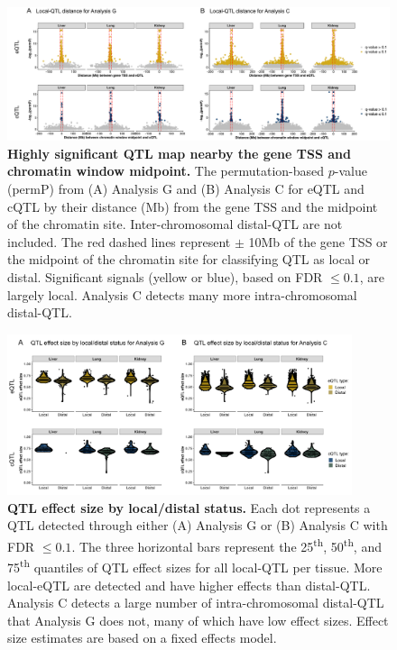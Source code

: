 \documentclass[10pt,letterpaper,twoside]{article}
\begin{document}
\begin{figure}[hp]
\renewcommand{\familydefault}{\sfdefault}\normalfont
\centering
\includegraphics[width=\textwidth]{figs/qtl_distance_all.pdf}
\caption{\textbf{Highly significant QTL map nearby the gene TSS and chromatin window midpoint.} 
The permutation-based $p$-value (permP) from (A) Analysis G and (B) Analysis C for eQTL and cQTL by their distance (Mb) from the gene TSS and the midpoint of the chromatin site. Inter-chromosomal distal-QTL are not included. The red dashed lines represent $\pm$ 10Mb of the gene TSS or the midpoint of the chromatin site for classifying QTL as local or distal. Significant signals (yellow or blue), based on FDR $\le 0.1$, are largely local. Analysis C detects many more intra-chromosomal distal-QTL.
\label{fig:dist_all}}
\end{figure}

\clearpage

\begin{figure}[hp]
\renewcommand{\familydefault}{\sfdefault}\normalfont
\centering
\includegraphics[width=0.9\textwidth, trim={0in 0.25in 0in 0in}, clip]{figs/qtl_effect_sizes_local_v_distal.png}
\caption{\textbf{QTL effect size by local/distal status.} 
Each dot represents a QTL detected through either (A) Analysis G or (B) Analysis C with FDR $\le 0.1$. The three horizontal bars represent the 25\textsuperscript{th}, 50\textsuperscript{th}, and 75\textsuperscript{th} quantiles of QTL effect sizes for all local-QTL per tissue. More local-eQTL are detected and have higher effects than distal-QTL. Analysis C detects a large number of intra-chromosomal distal-QTL that Analysis G does not, many of which have low effect sizes. Effect size estimates are based on a fixed effects model.
\label{fig:qtl_effect_sizes_local_v_distal}}
\end{figure}
\end{document}
